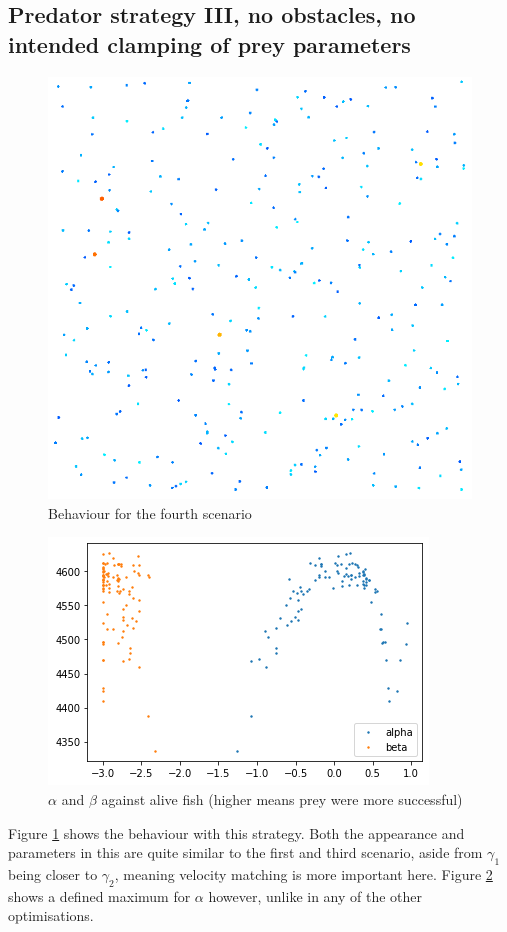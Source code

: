 \documentclass[12pt]{article}
\begin{document}
\subsection{Predator strategy III, no obstacles, no intended clamping of prey parameters}
\begin{figure}[H]
    \centering
    \includegraphics[width=0.5\linewidth]{fig/scenario4.png}
    \caption{Behaviour for the fourth scenario}
    \label{fig:scenarioiv}
\end{figure}
\begin{figure}[H]
    \centering
    \includegraphics[width=0.5\linewidth]{fig/alpha_beta.png}
    \caption{$\alpha$ and $\beta$ against alive fish (higher means prey were more successful)}
    \label{fig:alphabeta}
\end{figure}
Figure \ref{fig:scenarioiv} shows the behaviour with this strategy. Both the appearance and parameters in this are quite similar to the first and third scenario, aside from $\gamma_1$ being closer to $\gamma_2$, meaning velocity matching is more important here. Figure \ref{fig:alphabeta} shows a defined maximum for $\alpha$ however, unlike in any of the other optimisations.
\end{document}
